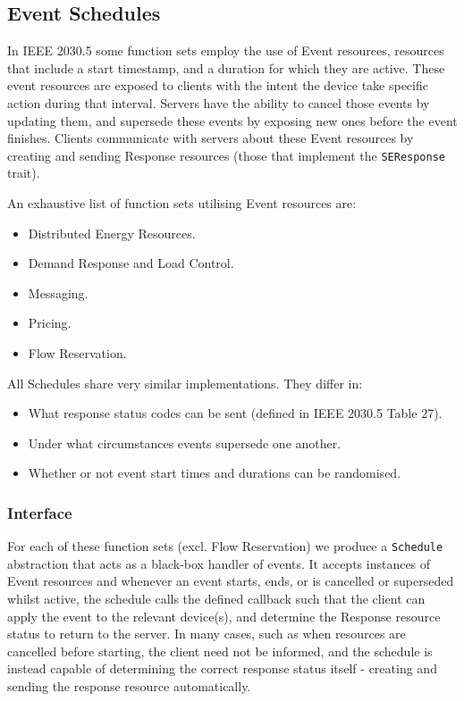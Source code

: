 \subsection{Event Schedules}
In IEEE 2030.5 some function sets employ the use of Event resources, resources that include a start timestamp, and a duration for which they are active. These event resources are exposed to clients with the intent the device take specific action during that interval. Servers have the ability to cancel those events by updating them, and supersede these events by exposing new ones before the event finishes. Clients communicate with servers about these Event resources by creating and sending Response resources (those that implement the \texttt{SEResponse} trait).

An exhaustive list of function sets utilising Event resources are:

\begin{itemize}
    \item Distributed Energy Resources.
    \item Demand Response and Load Control.
    \item Messaging.
    \item Pricing.
    \item Flow Reservation.
\end{itemize}

All Schedules share very similar implementations. They differ in:

\begin{itemize}
    \item What response status codes can be sent (defined in IEEE 2030.5 Table 27).
    \item Under what circumstances events supersede one another.
    \item Whether or not event start times and durations can be randomised.
\end{itemize}

\subsubsection{Interface}

For each of these function sets (excl. Flow Reservation) we produce a \texttt{Schedule} abstraction that acts as a black-box handler of events. It accepts instances of Event resources and whenever an event starts, ends, or is cancelled or superseded whilst active, the schedule calls the defined callback such that the client can apply the event to the relevant device(s), and determine the Response resource status to return to the server. In many cases, such as when resources are cancelled before starting, the client need not be informed, and the schedule is instead capable of determining the correct response status itself - creating and sending the response resource automatically.

